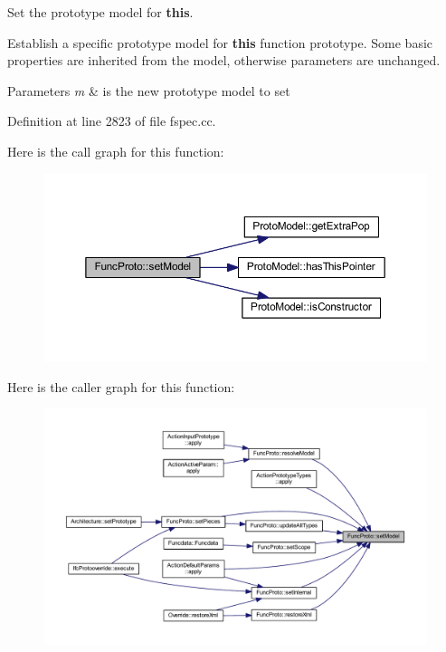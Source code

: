 Set the prototype model for {\bfseries{this}}. 

Establish a specific prototype model for {\bfseries{this}} function prototype. Some basic properties are inherited from the model, otherwise parameters are unchanged. 
\begin{DoxyParams}{Parameters}
{\em m} & is the new prototype model to set \\
\hline
\end{DoxyParams}


Definition at line 2823 of file fspec.\+cc.

Here is the call graph for this function\+:
\nopagebreak
\begin{figure}[H]
\begin{center}
\leavevmode
\includegraphics[width=350pt]{class_func_proto_ae8c14d15c7296c47deae3433687b1b15_cgraph}
\end{center}
\end{figure}
Here is the caller graph for this function\+:
\nopagebreak
\begin{figure}[H]
\begin{center}
\leavevmode
\includegraphics[width=350pt]{class_func_proto_ae8c14d15c7296c47deae3433687b1b15_icgraph}
\end{center}
\end{figure}
\mbox{\label{class_func_proto_acc303c449c418dd875319c6f6cd9436f}} 
